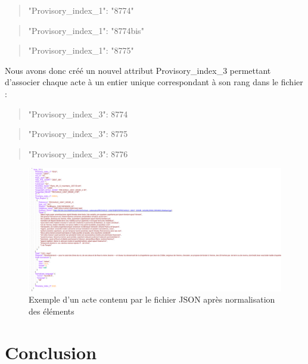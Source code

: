 \documentclass[a4paper,12pt,twoside]{book}
\begin{document}
	\begin{quotation}
		"Provisory\_index\_1": "8774"
	\end{quotation}
	
	\begin{quotation}
		"Provisory\_index\_1": "8774bis"
	\end{quotation}

	\begin{quotation}
		"Provisory\_index\_1": "8775"
	\end{quotation}
	
	\noindent Nous avons donc créé un nouvel attribut \og Provisory\_index\_3\fg{} permettant d'associer chaque acte à un entier unique correspondant à son rang dans le fichier :
	
	\begin{quotation}
		"Provisory\_index\_3": 8774
	\end{quotation}

	\begin{quotation}
		"Provisory\_index\_3": 8775
	\end{quotation}
	
	\begin{quotation}
		"Provisory\_index\_3": 8776
	\end{quotation}

	\begin{figure}
		\centering
		\includegraphics[width=\textwidth]{Images/json_modifie.png}
		\caption{Exemple d'un acte contenu par le fichier JSON après normalisation des éléments}
		\label{json_final}
	\end{figure}
	
	
	\section*{Conclusion}
	
\end{document}
